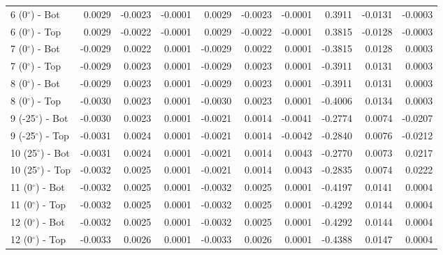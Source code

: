 \begin{table}[H]
\begin{longtable}{lrrrrrrrrr}
   6 (0$^\circ$) - Bot &        0.0029 &       -0.0023 &       -0.0001 &        0.0029 &       -0.0023 &       -0.0001 &      0.3911 &     -0.0131 &     -0.0003 \\
   6 (0$^\circ$) - Top &        0.0029 &       -0.0022 &       -0.0001 &        0.0029 &       -0.0022 &       -0.0001 &      0.3815 &     -0.0128 &     -0.0003 \\
   7 (0$^\circ$) - Bot &       -0.0029 &        0.0022 &        0.0001 &       -0.0029 &        0.0022 &        0.0001 &     -0.3815 &      0.0128 &      0.0003 \\
   7 (0$^\circ$) - Top &       -0.0029 &        0.0023 &        0.0001 &       -0.0029 &        0.0023 &        0.0001 &     -0.3911 &      0.0131 &      0.0003 \\
   8 (0$^\circ$) - Bot &       -0.0029 &        0.0023 &        0.0001 &       -0.0029 &        0.0023 &        0.0001 &     -0.3911 &      0.0131 &      0.0003 \\
   8 (0$^\circ$) - Top &       -0.0030 &        0.0023 &        0.0001 &       -0.0030 &        0.0023 &        0.0001 &     -0.4006 &      0.0134 &      0.0003 \\
 9 (-25$^\circ$) - Bot &       -0.0030 &        0.0023 &        0.0001 &       -0.0021 &        0.0014 &       -0.0041 &     -0.2774 &      0.0074 &     -0.0207 \\
 9 (-25$^\circ$) - Top &       -0.0031 &        0.0024 &        0.0001 &       -0.0021 &        0.0014 &       -0.0042 &     -0.2840 &      0.0076 &     -0.0212 \\
 10 (25$^\circ$) - Bot &       -0.0031 &        0.0024 &        0.0001 &       -0.0021 &        0.0014 &        0.0043 &     -0.2770 &      0.0073 &      0.0217 \\
 10 (25$^\circ$) - Top &       -0.0032 &        0.0025 &        0.0001 &       -0.0021 &        0.0014 &        0.0043 &     -0.2835 &      0.0074 &      0.0222 \\
  11 (0$^\circ$) - Bot &       -0.0032 &        0.0025 &        0.0001 &       -0.0032 &        0.0025 &        0.0001 &     -0.4197 &      0.0141 &      0.0004 \\
  11 (0$^\circ$) - Top &       -0.0032 &        0.0025 &        0.0001 &       -0.0032 &        0.0025 &        0.0001 &     -0.4292 &      0.0144 &      0.0004 \\
  12 (0$^\circ$) - Bot &       -0.0032 &        0.0025 &        0.0001 &       -0.0032 &        0.0025 &        0.0001 &     -0.4292 &      0.0144 &      0.0004 \\
  12 (0$^\circ$) - Top &       -0.0033 &        0.0026 &        0.0001 &       -0.0033 &        0.0026 &        0.0001 &     -0.4388 &      0.0147 &      0.0004 \\
\end{longtable}
\end{table}